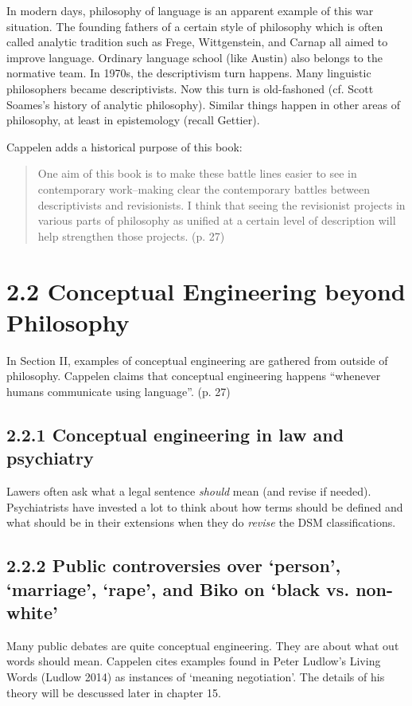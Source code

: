 \documentclass[
10pt, %
a4paper, %
twocolumn, %
landscape %
]{article}
\begin{document}
In modern days, philosophy of language is an apparent example of this war situation.
The founding fathers of a certain style of philosophy which is often called analytic tradition such as Frege, Wittgenstein, and Carnap all aimed to improve language.
Ordinary language school (like Austin) also belongs to the normative team.
In 1970s, the descriptivism turn happens. Many linguistic philosophers became descriptivists. Now this turn is old-fashoned (cf. Scott Soames's history of analytic philosophy).
Similar things happen in other areas of philosophy, at least in epistemology (recall Gettier).

Cappelen adds a historical purpose of this book:
\begin{quote}
One aim of this book is to make these battle lines easier to see in contemporary
work--making clear the contemporary battles between descriptivists and revisionists. I think that seeing the revisionist projects in various parts of philosophy as unified at a certain level of description will help strengthen those projects.
(p. 27)
\end{quote}


\section*{2.2 Conceptual Engineering beyond Philosophy}
In Section II, examples of conceptual engineering are gathered from outside of philosophy.
Cappelen claims that conceptual  engineering happens ``whenever humans communicate using language''. (p. 27)

\subsection*{2.2.1 Conceptual engineering in law and psychiatry}
Lawers often ask what a legal sentence \emph{should} mean (and revise if needed). Psychiatrists have invested a lot to think about how terms should be defined and what should be in their extensions when they do \emph{revise} the DSM classifications.
\subsection*{2.2.2 Public controversies over `person', `marriage', `rape', and Biko on `black vs. non-white'}
Many public debates are quite conceptual engineering. They are about what out words should mean.
Cappelen cites examples found in Peter Ludlow's Living Words (Ludlow 2014) as instances of `meaning negotiation'.
The details of his theory will be descussed later in chapter 15.
\end{document}
